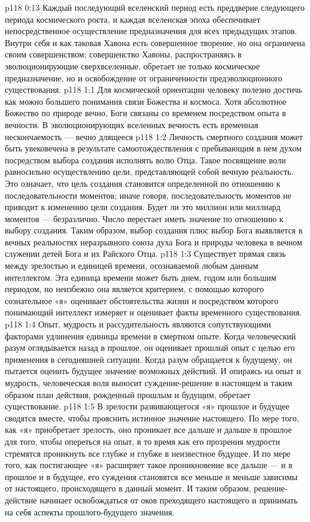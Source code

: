\vs p118 0:13 Каждый последующий вселенский период есть преддверие следующего периода космического роста, и каждая вселенская эпоха обеспечивает непосредственное осуществление предназначения для всех предыдущих этапов. Внутри себя и как таковая Хавона есть совершенное творение, но она ограничена своим совершенством; совершенство Хавоны, распространяясь в эволюционирующие сверхвселенные, обретает не только космическое предназначение, но и освобождение от ограниченности предэволюционного существования.
\vs p118 1:1 Для космической ориентации человеку полезно достичь как можно большего понимания связи Божества и космоса. Хотя абсолютное Божество по природе вечно, Боги связаны со временем посредством опыта в вечности. В эволюционирующих вселенных вечность есть временная нескончаемость --- вечно длящееся 
\vs p118 1:2 \pc Личность смертного создания может быть увековечена в результате самоотождествления с пребывающим в нем духом посредством выбора создания исполнять волю Отца. Такое посвящение воли равносильно осуществлению цели, представляющей собой вечную реальность. Это означает, что цель создания становится определенной по отношению к последовательности моментов; иначе говоря, последовательность моментов не приводит к изменению цели создания. Будет ли это миллион или миллиард моментов --- безразлично. Число перестает иметь значение по отношению к выбору создания. Таким образом, выбор создания плюс выбор Бога выявляется в вечных реальностях неразрывного союза духа Бога и природы человека в вечном служении детей Бога и их Райского Отца.
\vs p118 1:3 Существует прямая связь между зрелостью и единицей времени, осознаваемой любым данным интеллектом. Эта единица времени может быть днем, годом или большим периодом, но неизбежно она является критерием, с помощью которого сознательное «я» оценивает обстоятельства жизни и посредством которого понимающий интеллект измеряет и оценивает факты временного существования.
\vs p118 1:4 Опыт, мудрость и рассудительность являются сопутствующими факторами удлинения единицы времени в смертном опыте. Когда человеческий разум оглядывается назад в прошлое, он оценивает прошлый опыт с целью его применения в сегодняшней ситуации. Когда разум обращается к будущему, он пытается оценить будущее значение возможных действий. И опираясь на опыт и мудрость, человеческая воля выносит суждение\hyp{}решение в настоящем и таким образом план действия, рожденный прошлым и будущим, обретает существование.
\vs p118 1:5 В зрелости развивающегося «я» прошлое и будущее сводятся вместе, чтобы прояснить истинное значение настоящего. По мере того, как «я» приобретает зрелость, оно проникает все дальше и дальше в прошлое для того, чтобы опереться на опыт, в то время как его прозрения мудрости стремятся проникнуть все глубже и глубже в неизвестное будущее. И по мере того, как постигающее «я» расширяет такое проникновение все дальше --- и в прошлое и в будущее, его суждения становятся все меньше и меньше зависимы от настоящего, происходящего в данный момент. И таким образом, решение\hyp{}действие начинает освобождаться от оков преходящего настоящего и принимать на себя аспекты прошлого\hyp{}будущего значения.
